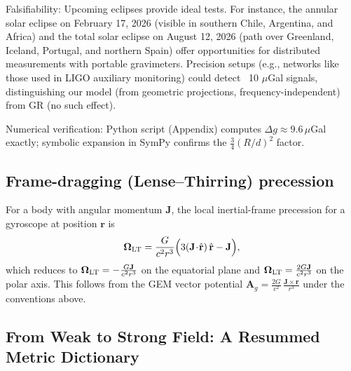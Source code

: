 Falsifiability: Upcoming eclipses provide ideal tests. For instance, the annular solar eclipse on February 17, 2026 (visible in southern Chile, Argentina, and Africa) and the total solar eclipse on August 12, 2026 (path over Greenland, Iceland, Portugal, and northern Spain) offer opportunities for distributed measurements with portable gravimeters. Precision setups (e.g., networks like those used in LIGO auxiliary monitoring) could detect ~10 $\mu$Gal signals, distinguishing our model (from geometric projections, frequency-independent) from GR (no such effect).

Numerical verification: Python script (Appendix) computes $\Delta g \approx 9.6 \, \mu$Gal exactly; symbolic expansion in SymPy confirms the $\frac{3}{4} (R/d)^2$ factor.

\medskip
\noindent
{}
\medskip



\subsection*{Frame-dragging (Lense--Thirring) precession}
For a body with angular momentum $\mathbf{J}$, the local inertial-frame precession for a gyroscope at position $\mathbf{r}$ is
\begin{equation}
\boldsymbol{\Omega}_{\rm LT}=\frac{G}{c^2 r^3}\Big(3(\mathbf{J}\!\cdot\!\hat{\mathbf r})\,\hat{\mathbf r}-\mathbf{J}\Big),
\end{equation}
which reduces to $\boldsymbol{\Omega}_{\rm LT} = -\frac{G\mathbf{J}}{c^2 r^3}$ on the equatorial plane and
$\boldsymbol{\Omega}_{\rm LT} = \frac{2G\mathbf{J}}{c^2 r^3}$ on the polar axis. This follows from the GEM vector potential
$\mathbf{A}_g = \frac{2G}{c^2}\,\frac{\mathbf{J}\times \mathbf{r}}{r^3}$ under the conventions above.

\subsection{From Weak to Strong Field: A Resummed Metric Dictionary}
\label{sec:strong-dict}

